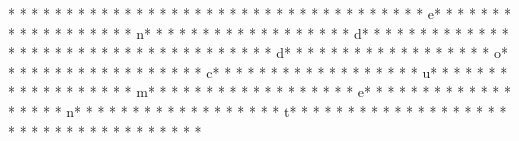 * * *  * * *  * * *  *  * * *  *  * * *  * 
* * *  * * *  * * *  *  * * *  *  * * *  * e* * *  * * *  * * *  *  * * *  *  * * *  * n* * *  * * *  * * *  *  * * *  *  * * *  * d* * *  * * *  * * *  *  * * *  *  * * *  * {* * *  * * *  * * *  *  * * *  *  * * *  * d* * *  * * *  * * *  *  * * *  *  * * *  * o* * *  * * *  * * *  *  * * *  *  * * *  * c* * *  * * *  * * *  *  * * *  *  * * *  * u* * *  * * *  * * *  *  * * *  *  * * *  * m* * *  * * *  * * *  *  * * *  *  * * *  * e* * *  * * *  * * *  *  * * *  *  * * *  * n* * *  * * *  * * *  *  * * *  *  * * *  * t* * *  * * *  * * *  *  * * *  *  * * *  * }* * *  * * *  * * *  *  * * *  *  * * *  * 
